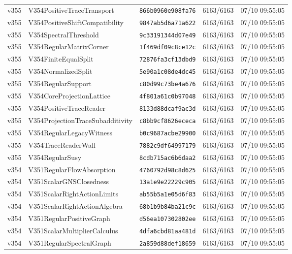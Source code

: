 \documentclass[11pt]{article}
\theoremstyle{definition}\newtheorem{deriv}{Derivação}
\begin{document}
{\begin{longtable}{@{}lllll@{}}
v355 & V354PositiveTraceTransport & \texttt{866b0960e908fa76} & 6163/6163 & 07/10 09:55:05 \\
v355 & V354PositiveShiftCompatibility & \texttt{9847ab5d6a71a622} & 6163/6163 & 07/10 09:55:05 \\
v355 & V354SpectralThreshold & \texttt{9c33191344d07e49} & 6163/6163 & 07/10 09:55:05 \\
v355 & V354RegularMatrixCorner & \texttt{1f469df09c8ce12c} & 6163/6163 & 07/10 09:55:05 \\
v355 & V354FiniteEqualSplit & \texttt{72876fa3cf13dbd9} & 6163/6163 & 07/10 09:55:05 \\
v355 & V354NormalizedSplit & \texttt{5e90a1c08de4dc45} & 6163/6163 & 07/10 09:55:05 \\
v355 & V354RegularSupport & \texttt{c80d99c73be4a676} & 6163/6163 & 07/10 09:55:05 \\
v355 & V354CoreProjectionLattice & \texttt{4f801a61c0b97048} & 6163/6163 & 07/10 09:55:05 \\
v355 & V354PositiveTraceReader & \texttt{8133d88dcaf9ac3d} & 6163/6163 & 07/10 09:55:05 \\
v355 & V354ProjectionTraceSubadditivity & \texttt{c8bb9cf8626ececa} & 6163/6163 & 07/10 09:55:05 \\
v355 & V354RegularLegacyWitness & \texttt{b0c9687acbe29900} & 6163/6163 & 07/10 09:55:05 \\
v355 & V354TraceReaderWall & \texttt{7882c9df64997179} & 6163/6163 & 07/10 09:55:05 \\
v355 & V354RegularSusy & \texttt{8cdb715ac6b6daa2} & 6163/6163 & 07/10 09:55:05 \\
v354 & V351RegularFlowAbsorption & \texttt{4760792d98c8d625} & 6163/6163 & 07/10 09:55:05 \\
v354 & V351ScalarGNSClosedness & \texttt{13a1e9e22229c905} & 6163/6163 & 07/10 09:55:05 \\
v354 & V351ScalarRightActionLimits & \texttt{ab55b5a1e05d6f83} & 6163/6163 & 07/10 09:55:05 \\
v354 & V351ScalarRightActionAlgebra & \texttt{68b1b9b84ba21c9c} & 6163/6163 & 07/10 09:55:05 \\
v354 & V351RegularPositiveGraph & \texttt{d56ea107302802ee} & 6163/6163 & 07/10 09:55:05 \\
v354 & V351ScalarMultiplierCalculus & \texttt{4dfa6cbd81aa481d} & 6163/6163 & 07/10 09:55:05 \\
v354 & V351RegularSpectralGraph & \texttt{2a859d88def18659} & 6163/6163 & 07/10 09:55:05 \\

\end{longtable}}
\end{document}
